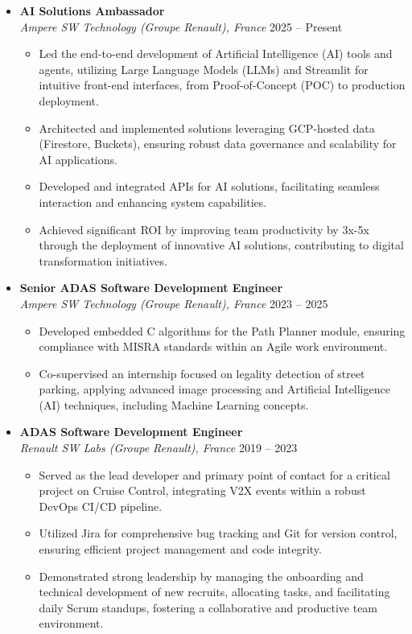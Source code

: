 \documentclass[a4paper,10pt]{article}
\begin{document}
\begin{itemize}[left=0pt, label={}]
    \item \textbf{AI Solutions Ambassador} \\
    \textit{Ampere SW Technology (Groupe Renault), France} \hfill 2025 – Present
    \begin{itemize}
        \item Led the end-to-end development of Artificial Intelligence (AI) tools and agents, utilizing Large Language Models (LLMs) and Streamlit for intuitive front-end interfaces, from Proof-of-Concept (POC) to production deployment.
        \item Architected and implemented solutions leveraging GCP-hosted data (Firestore, Buckets), ensuring robust data governance and scalability for AI applications.
        \item Developed and integrated APIs for AI solutions, facilitating seamless interaction and enhancing system capabilities.
        \item Achieved significant ROI by improving team productivity by 3x-5x through the deployment of innovative AI solutions, contributing to digital transformation initiatives.
    \end{itemize}

    \item \textbf{Senior ADAS Software Development Engineer} \\
    \textit{Ampere SW Technology (Groupe Renault), France} \hfill 2023 – 2025
    \begin{itemize}
        \item Developed embedded C algorithms for the Path Planner module, ensuring compliance with MISRA standards within an Agile work environment.
        \item Co-supervised an internship focused on legality detection of street parking, applying advanced image processing and Artificial Intelligence (AI) techniques, including Machine Learning concepts.
    \end{itemize}

    \item \textbf{ADAS Software Development Engineer} \\
    \textit{Renault SW Labs (Groupe Renault), France} \hfill 2019 – 2023
    \begin{itemize}
        \item Served as the lead developer and primary point of contact for a critical project on Cruise Control, integrating V2X events within a robust DevOps CI/CD pipeline.
        \item Utilized Jira for comprehensive bug tracking and Git for version control, ensuring efficient project management and code integrity.
        \item Demonstrated strong leadership by managing the onboarding and technical development of new recruits, allocating tasks, and facilitating daily Scrum standups, fostering a collaborative and productive team environment.
    \end{itemize}


\end{itemize}
\end{document}
